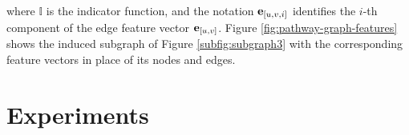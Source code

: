 where $\mathbb{I}$ is the indicator function, and the notation $\Elem{e}{u, v, i}$ identifies the $i$-th component of the edge feature vector $\Elem{e}{u, v}$. Figure \ref{fig:pathway-graph-features} shows the induced subgraph of Figure \ref{subfig:subgraph3} with the corresponding feature vectors in place of its nodes and edges.
\begin{figure*}[h!]
    \centering
    \resizebox{.8\textwidth}{!}{}
    \caption{A representation of the node and edge feature vectors of the induced subgraph shown in Figure \ref{subfig:subgraph3}. Each node is represented as a 3-dimensional binary vector, where 1 is indicated with dark grey and 0 with white. To avoid visual cluttering, we only show one example of edge feature vector per edge type (the column vectors inside the dashed circles).}
    \label{fig:pathway-graph-features}
\end{figure*}

\section{Experiments}